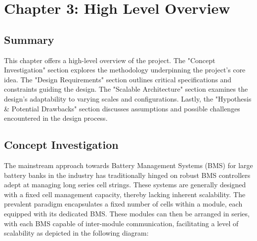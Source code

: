 \chapter[High Level Overview]{Chapter 3: High Level Overview}\label{chap:HL_overview}
\section{Summary}\label{sec:intro_HLovv}
This chapter offers a high-level overview of the project. The "Concept Investigation" section explores the methodology underpinning the project's core idea. The "Design Requirements" section outlines critical specifications and constraints guiding the design. The "Scalable Architecture" section examines the design's adaptability to varying scales and configurations. Lastly, the "Hypothesis \& Potential Drawbacks" section discusses assumptions and possible challenges encountered in the design process.
\section{Concept Investigation}\label{sec:consep}
The mainstream approach towards Battery Management Systems (BMS) for large battery banks in the industry has traditionally hinged on robust BMS controllers adept at managing long series cell strings. These systems are generally designed with a fixed cell management capacity, thereby lacking inherent scalability. The prevalent paradigm encapsulates a fixed number of cells within a module, each equipped with its dedicated BMS. These modules can then be arranged in series, with each BMS capable of inter-module communication, facilitating a level of scalability as depicted in the following diagram:


